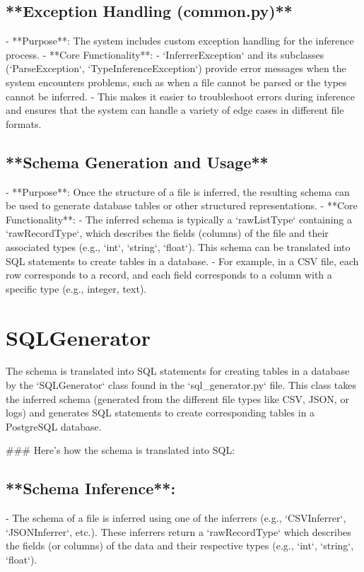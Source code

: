 \documentclass[sigconf,natbib=false]{acmart}
\begin{document}
\begin{draft}
 
\subsection{**Exception Handling (common.py)**}
   - **Purpose**: The system includes custom exception handling for the inference process.
   - **Core Functionality**:
     - `InferrerException` and its subclasses (`ParseException`, `TypeInferenceException`) provide error messages when the system encounters problems, such as when a file cannot be parsed or the types cannot be inferred.
     - This makes it easier to troubleshoot errors during inference and ensures that the system can handle a variety of edge cases in different file formats.

\subsection{ **Schema Generation and Usage**}
   - **Purpose**: Once the structure of a file is inferred, the resulting schema can be used to generate database tables or other structured representations.
   - **Core Functionality**:
     - The inferred schema is typically a `rawListType` containing a `rawRecordType`, which describes the fields (columns) of the file and their associated types (e.g., `int`, `string`, `float`). This schema can be translated into SQL statements to create tables in a database.
     - For example, in a CSV file, each row corresponds to a record, and each field corresponds to a column with a specific type (e.g., integer, text).


\section{SQLGenerator}

The schema is translated into SQL statements for creating tables in a database by the `SQLGenerator` class found in the `sql_generator.py` file. This class takes the inferred schema (generated from the different file types like CSV, JSON, or logs) and generates SQL statements to create corresponding tables in a PostgreSQL database.

### Here’s how the schema is translated into SQL:

 
\subsection{**Schema Inference**:}
   - The schema of a file is inferred using one of the inferrers (e.g., `CSVInferrer`, `JSONInferrer`, etc.). These inferrers return a `rawRecordType` which describes the fields (or columns) of the data and their respective types (e.g., `int`, `string`, `float`).
 

\end{draft}
\end{document}
